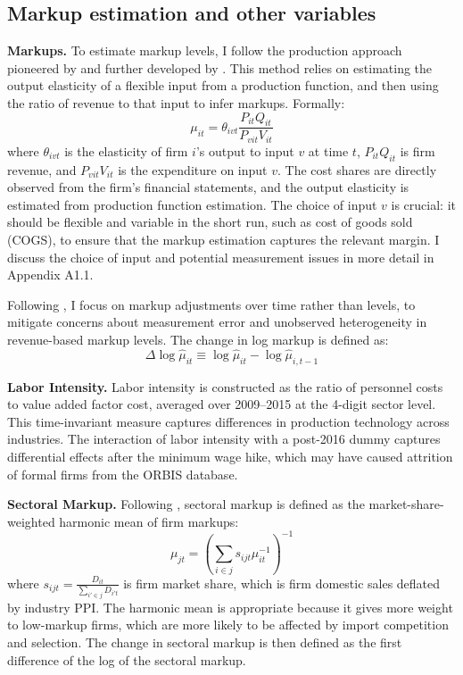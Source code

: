 \documentclass[12pt]{article}
\begin{document}
\subsection{Markup estimation and other variables}

\textbf{Markups.} To estimate markup levels, I follow the production approach pioneered by \textcite{hallRelationPriceMarginal1988} and further developed by \textcite{deloeckerMarkupsFirmLevelExport2012}. This method relies on estimating the output elasticity of a flexible input from a production function, and then using the ratio of revenue to that input to infer markups. Formally:$$\mu_{it} = \theta_{ivt} \frac{P_{it}Q_{it}}{P_{vit}V_{it}}$$
where $\theta_{ivt}$ is the elasticity of firm $i$'s output to input $v$ at time $t$, $P_{it}Q_{it}$ is firm revenue, and $P_{vit}V_{it}$ is the expenditure on input $v$. The cost shares are directly observed from the firm's financial statements, and the output elasticity is estimated from production function estimation. The choice of input $v$ is crucial: it should be flexible and variable in the short run, such as cost of goods sold (COGS), to ensure that the markup estimation captures the relevant margin. I discuss the choice of input and potential measurement issues in more detail in Appendix A1.1.

Following \textcite{deridderHitchhikersGuideMarkup2026}, I focus on markup adjustments over time rather than levels, to mitigate concerns about measurement error and unobserved heterogeneity in revenue-based markup levels. The change in log markup is defined as:
\[
\Delta \log \hat{\mu}_{it} \equiv \log \hat{\mu}_{it} - \log \hat{\mu}_{i,t-1}
\]

\textbf{Labor Intensity.} Labor intensity is constructed as the ratio of personnel costs to value added factor cost, averaged over 2009--2015 at the 4-digit sector level. This time-invariant measure captures differences in production technology across industries. The interaction of labor intensity with a post-2016 dummy captures differential effects after the minimum wage hike, which may have caused attrition of formal firms from the ORBIS database.

\textbf{Sectoral Markup.} Following \textcite{bursteinBottomUpMarkupFluctuations2025}, sectoral markup is defined as the market-share-weighted harmonic mean of firm markups:
\[
\mu_{jt} = \left( \sum_{i \in j} s_{ijt} \mu_{it}^{-1} \right)^{-1}
\]
where $s_{ijt} = \frac{D_{it}}{\sum_{i' \in j} D_{i't}}$ is firm market share, which is firm domestic sales deflated by industry PPI. The harmonic mean is appropriate because it gives more weight to low-markup firms, which are more likely to be affected by import competition and selection. The change in sectoral markup is then defined as the first difference of the log of the sectoral markup.
\end{document}
